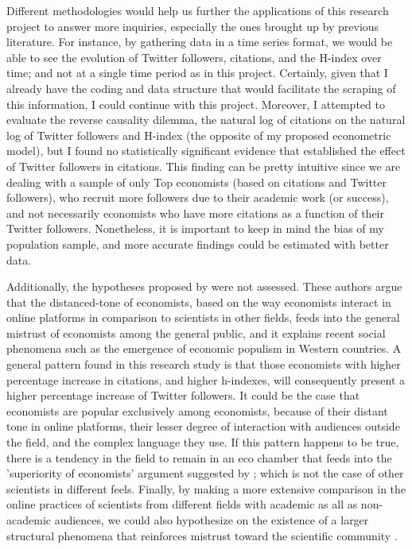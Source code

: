 \documentclass[12pt,english]{article}
\begin{document}
Different methodologies would help us further the applications of this research project to answer more inquiries, especially the ones brought up by previous literature. For instance, by gathering data in a time series format, we would be able to see the evolution of Twitter followers, citations, and the H-index over time; and not at a single time period as in this project. Certainly, given that I already have the coding and data structure that would facilitate the scraping of this information, I could continue with this project. Moreover, I attempted to evaluate the reverse causality dilemma, the natural log of citations on the natural log of Twitter followers and H-index (the opposite of my proposed econometric model), but I found no statistically significant evidence that established the effect of Twitter followers in citations. This finding can be pretty intuitive since we are dealing with a sample of only Top economists (based on citations and Twitter followers), who recruit more followers due to their academic work (or success), and not necessarily economists who have more citations as a function of their Twitter followers. Nonetheless, it is important to keep in mind the bias of my population sample, and more accurate findings could be estimated with better data. 
 
Additionally, the hypotheses proposed by \cite{giusta.2018} were not assessed. These authors argue that the distanced-tone of economists, based on the way economists interact in online platforms in comparison to scientists in other fields, feeds into the general mistrust of economists among the general public, and it explains recent social phenomena such as the emergence of economic populism in Western countries. A general pattern found in this research study is that those economists with higher percentage increase in citations, and higher h-indexes, will consequently present a higher percentage increase of Twitter followers. It could be the case that economists are popular exclusively among economists, because of their distant tone in online platforms, their lesser degree of interaction with audiences outside the field, and the complex language they use. If this pattern happens to be true, there is a tendency in the field to remain in an eco chamber that feeds into the 'superiority of economists' argument suggested by \citep{superiority}; which is not the case of other scientists in different feels. Finally, by making a more extensive comparison in the online practices of scientists from different fields with academic as all as non-academic audiences, we could also hypothesize on the existence of a larger structural phenomena that reinforces mistrust toward the scientific community \citep{new.yorker}. 
\end{document}
